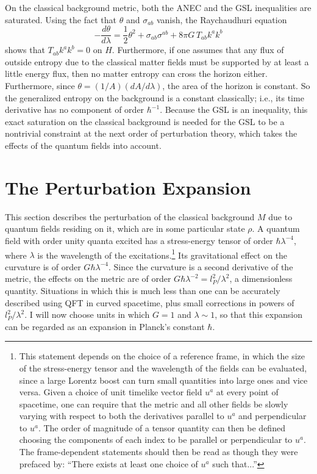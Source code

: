 \documentclass{article}
\begin{document}
On the classical background metric, both the ANEC and the GSL inequalities are saturated.  Using the fact that $\theta$ and $\sigma_{ab}$ vanish, the Raychaudhuri equation
\begin{equation}\label{Ray}
-\frac{d\theta}{d\lambda} = \frac{1}{2}\theta^2 
+ \sigma_{ab}\sigma^{ab}
+ 8\pi G\,T_{ab} k^a k^b
\end{equation}
shows that $T_{ab} k^a k^b = 0$ on $H$.  Furthermore, if one assumes that any flux of outside entropy due to the classical matter fields must be supported by at least a little energy flux, then no matter entropy can cross the horizon either.  Furthermore, since $\theta = (1/A)(dA/{d\lambda})$, the area of the horizon is constant.  So the generalized entropy on the background is a constant classically; i.e., its time derivative has no component of order $\hbar^{-1}$.  Because the GSL is an inequality, this exact saturation on the classical background is needed for the GSL to be a nontrivial constraint at the next order of perturbation theory, which takes the effects of the quantum fields into account.

\section{The Perturbation Expansion}\label{pert}

This section describes the perturbation of the classical background $M$ due to quantum fields residing on it, which are in some particular state $\rho$.  A quantum field with order unity quanta excited has a stress-energy tensor of order $\hbar \lambda^{-4}$, where $\lambda$ is the wavelength of the excitations.\footnote{This statement depends on the choice of a reference frame, in which the size of the stress-energy tensor and the wavelength of the fields can be evaluated, since a large Lorentz boost can turn small quantities into large ones and vice versa.  Given a choice of unit timelike vector field $u^a$ at every point of spacetime, one can require that the metric and all other fields be slowly varying with respect to both the derivatives parallel to $u^a$ and perpendicular to $u^a$.  The order of magnitude of a tensor quantity can then be defined choosing the components of each index to be parallel or perpendicular to $u^a$.  The frame-dependent statements should then be read as though they were prefaced by: ``There exists at least one choice of $u^a$ such that...''}
Its gravitational effect on the curvature is of order $G\hbar \lambda^{-4}$.  Since the curvature is a second derivative of the metric, the effects on the metric are of order $G\hbar \lambda^{-2} = {l_P^2}/{\lambda^2}$, a dimensionless quantity.  Situations in which this is much less than one can be accurately described using QFT in curved spacetime, plus small corrections in powers of ${l_P^2}/{\lambda^2}$.  I will now choose units in which $G = 1$ and $\lambda \sim 1$, so that this expansion can be regarded as an expansion in Planck's constant $\hbar$.
\end{document}
